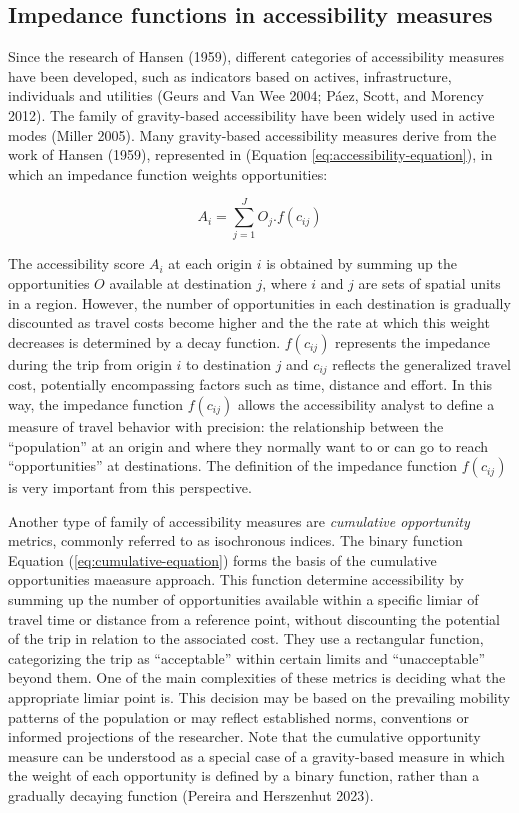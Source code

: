 \documentclass[preprint, 3p,
authoryear]{elsarticle} %
\begin{document}
\hypertarget{impedance-functions-in-accessibility-measures}{%
\subsection{Impedance functions in accessibility
measures}\label{impedance-functions-in-accessibility-measures}}

Since the research of Hansen (1959), different categories of
accessibility measures have been developed, such as indicators based on
actives, infrastructure, individuals and utilities (Geurs and Van Wee
2004; Páez, Scott, and Morency 2012). The family of gravity-based
accessibility have been widely used in active modes (Miller 2005). Many
gravity-based accessibility measures derive from the work of Hansen
(1959), represented in (Equation \ref{eq:accessibility-equation}), in
which an impedance function weights opportunities:

\begin{equation}
A_{i} = \sum_{j=1}^J O_j .f(c_{ij})
\label{eq:accessibility-equation}
\end{equation}

The accessibility score \(A_{i}\) at each origin \(i\) is obtained by
summing up the opportunities \(O\) available at destination \(j\), where
\(i\) and \(j\) are sets of spatial units in a region. However, the
number of opportunities in each destination is gradually discounted as
travel costs become higher and the the rate at which this weight
decreases is determined by a decay function. \(f(c_{ij})\) represents
the impedance during the trip from origin \(i\) to destination \(j\) and
\(c_{ij}\) reflects the generalized travel cost, potentially
encompassing factors such as time, distance and effort. In this way, the
impedance function \(f(c_{ij})\) allows the accessibility analyst to
define a measure of travel behavior with precision: the relationship
between the ``population'' at an origin and where they normally want to
or can go to reach ``opportunities'' at destinations. The definition of
the impedance function \(f(c_{ij})\) is very important from this
perspective.

Another type of family of accessibility measures are \emph{cumulative
opportunity} metrics, commonly referred to as isochronous indices. The
binary function Equation (\ref{eq:cumulative-equation}) forms the basis
of the cumulative opportunities maeasure approach. This function
determine accessibility by summing up the number of opportunities
available within a specific limiar of travel time or distance from a
reference point, without discounting the potential of the trip in
relation to the associated cost. They use a rectangular function,
categorizing the trip as ``acceptable'' within certain limits and
``unacceptable'' beyond them. One of the main complexities of these
metrics is deciding what the appropriate limiar point is. This decision
may be based on the prevailing mobility patterns of the population or
may reflect established norms, conventions or informed projections of
the researcher. Note that the cumulative opportunity measure can be
understood as a special case of a gravity-based measure in which the
weight of each opportunity is defined by a binary function, rather than
a gradually decaying function (Pereira and Herszenhut 2023).
\end{document}
